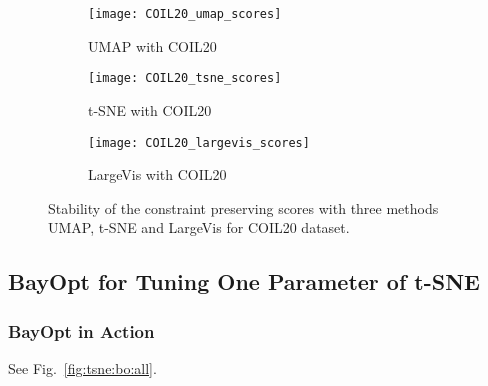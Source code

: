 \begin{figure*}[pos=h]
     \centering
     \begin{subfigure}[b]{0.32\textwidth}
         \centering
         \texttt{[image: COIL20\_umap\_scores]}
         \caption{UMAP with COIL20}
     \end{subfigure}
     \hfill
     \begin{subfigure}[b]{0.32\textwidth}
         \centering
         \texttt{[image: COIL20\_tsne\_scores]}
         \caption{t-SNE with COIL20}
     \end{subfigure}
     \hfill
     \begin{subfigure}[b]{0.32\textwidth}
         \centering
         \texttt{[image: COIL20\_largevis\_scores]}
         \caption{LargeVis with COIL20}
     \end{subfigure}
     \caption{Stability of the constraint preserving scores with three methods UMAP, t-SNE and LargeVis for COIL20 dataset.}
     \label{fig:score:stability:COIL20}
\end{figure*}


\subsection{BayOpt for Tuning One Parameter of t-SNE}

\subsubsection*{BayOpt in Action}
See Fig.~\ref{fig:tsne:bo:all}.

